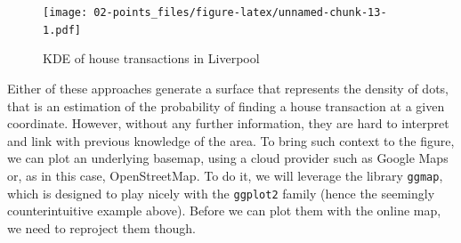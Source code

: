 \documentclass[]{book}
\newenvironment{Shaded}{\begin{snugshade}}{\end{snugshade}}
\newcommand{\KeywordTok}[1]{\textcolor[rgb]{0.13,0.29,0.53}{\textbf{#1}}}
\newcommand{\DataTypeTok}[1]{\textcolor[rgb]{0.13,0.29,0.53}{#1}}
\newcommand{\DecValTok}[1]{\textcolor[rgb]{0.00,0.00,0.81}{#1}}
\newcommand{\StringTok}[1]{\textcolor[rgb]{0.31,0.60,0.02}{#1}}
\newcommand{\CommentTok}[1]{\textcolor[rgb]{0.56,0.35,0.01}{\textit{#1}}}
\newcommand{\OperatorTok}[1]{\textcolor[rgb]{0.81,0.36,0.00}{\textbf{#1}}}
\newcommand{\NormalTok}[1]{#1}
\begin{document}
\begin{figure}
\centering
\texttt{[image: 02-points\_files/figure-latex/unnamed-chunk-13-1.pdf]}
\caption{\label{fig:unnamed-chunk-13}KDE of house transactions in Liverpool}
\end{figure}

Either of these approaches generate a surface that represents the
density of dots, that is an estimation of the probability of finding a
house transaction at a given coordinate. However, without any further
information, they are hard to interpret and link with previous knowledge
of the area. To bring such context to the figure, we can plot an
underlying basemap, using a cloud provider such as Google Maps or, as in
this case, OpenStreetMap. To do it, we will leverage the library
\texttt{ggmap}, which is designed to play nicely with the
\texttt{ggplot2} family (hence the seemingly counterintuitive example
above). Before we can plot them with the online map, we need to
reproject them though.

\begin{Shaded}
\end{Shaded}
\end{document}
